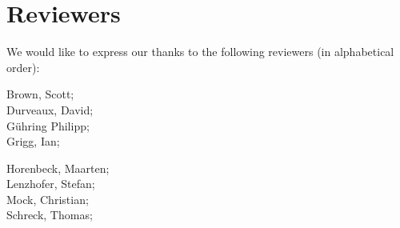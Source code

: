 \section{Reviewers}

We would like to express our thanks to the following reviewers (in alphabetical order):


\vline{}

\begin{minipage}[b]{0.5\linewidth}
\center
Brown, Scott; \\
Durveaux, David; \\
G\"uhring Philipp;  \\
Grigg, Ian;  \\
\end{minipage}
\begin{minipage}[b]{0.5\linewidth}
\center
Horenbeck, Maarten; \\
Lenzhofer, Stefan; \\
Mock, Christian;  \\
Schreck, Thomas;  \\
\end{minipage}


